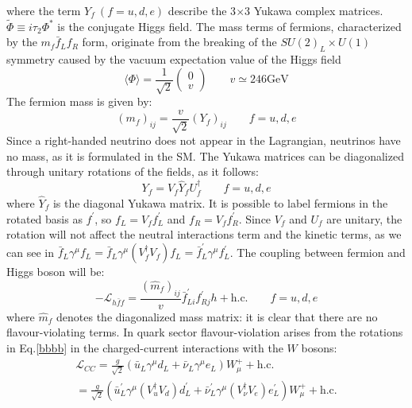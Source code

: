 
where the term $Y_f \ (f  =  u,d,e)$ describe the 3$\times$3 Yukawa complex matrices. $\widetilde{\Phi} \equiv i \tau_2 \Phi^*$ is the conjugate Higgs field. The mass terms of fermions, characterized by the $m_f \bar{f}_L f_R$ form, originate from the breaking of the $SU(2)_L \times U(1)$ symmetry caused by the  vacuum expectation value of the Higgs field
\begin{equation}\label{higgs}
\langle\Phi\rangle=\frac{1}{\sqrt{2}}\left(\begin{array}{l}
0 \\
v
\end{array}\right) \qquad v \simeq 246 \mathrm{GeV}
\end{equation}
The fermion mass is given by:
\begin{equation}
\left(m_f\right)_{i j}=\frac{v}{\sqrt{2}}\left(Y_f\right)_{i j} \qquad f=u, d, e
\end{equation}
Since a right-handed neutrino does not appear in the Lagrangian, neutrinos have no mass, as it is formulated in the SM. The Yukawa matrices can be diagonalized 
through unitary rotations of the fields, as it follows:
\begin{equation}\label{bbbb}
Y_f=V_f \hat{Y}_f U_f^{\dagger} \qquad f=u, d, e
\end{equation}
where $ \hat{Y}_f $ is the diagonal Yukawa matrix. It is possible to label fermions in the rotated basis as $f^{\prime}$, so $f_L=V_f f^{\prime}_L$ and $f_R=V_f f^{\prime}_R $. Since $V_f$ and $U_f$ are unitary, the rotation will not affect the neutral interactions term and the kinetic terms, as we can see in $\bar{f}_L \gamma^\mu f_L=\bar{f}_L \gamma^\mu\left(V_f^{\dagger} V_f\right) f_L=\bar{f}_L^{\prime} \gamma^\mu f_L^{\prime}$. The coupling between fermion and Higgs boson will be:
\begin{equation}
-\mathscr{L}_{h \bar{f} f}=\frac{(\hat{m}_f)_{i j}}{v} \bar{f}_{L i}^{\prime}f^{\prime}_{R j} h+\text{h.c.} \qquad f=u, d, e
\end{equation}
where $\hat{m}_f$ denotes the diagonalized mass matrix: it is clear that there are no flavour-violating terms.
In quark sector flavour-violation arises from the rotations in Eq.\ref{bbbb} in the charged-current interactions with the $W$ bosons:
\begin{equation}\label{quarkviolation}
\begin{array}{c}
      { \displaystyle 
\mathscr{L}_{C C}  =\frac{g}{\sqrt{2}}\left(\bar{u}_L \gamma^\mu d_L+\bar{\nu}_L \gamma^\mu e_L\right) W_\mu^{+}+\text {h.c.} }\\
 {\displaystyle=\frac{g}{\sqrt{2}}\left(\bar{u}^{\prime}_L \gamma^\mu\left(V_u^{\dagger} V_d\right) d_L^{\prime}+\bar{\nu}^{\prime}_L \gamma^\mu\left(V_\nu^{\dagger} V_e\right) e_L^{\prime}\right) W_\mu^{+}+\text {h.c.}}
\end{array}
\end{equation}


